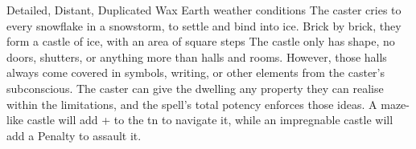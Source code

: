   {Detailed, Distant, Duplicated}%
  {Wax}%
  {Earth}%
  {weather conditions}%
  {The caster cries to every snowflake in a snowstorm, to settle and bind into ice.
    Brick by brick, they form a castle of ice, with an area of  square \glspl{step}}%
  {
    The castle only has shape, no doors, shutters, or anything more than halls and rooms.
    However, those halls always come covered in symbols, writing, or other elements from the caster's subconscious.
    The caster can give the dwelling any property they can realise within the limitations, and the spell's total potency enforces those ideas.
    A maze-like castle will add + to the \gls{tn} to navigate it, while an impregnable castle will add a Penalty to assault it.
  }

